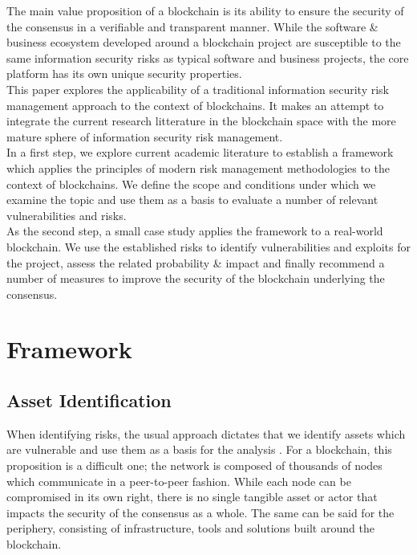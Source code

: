 \documentclass[12pt,a4paper]{article}
\begin{document}
The main value proposition of a \gls{blockchain} is its ability to ensure the security of the \gls{consensus} in a verifiable and transparent manner. While the software \& business ecosystem developed around a blockchain project are susceptible to the same information security risks as typical software and business projects, the core platform has its own unique security properties.\\

This paper explores the applicability of a traditional information security risk management approach to the context of \glspl{blockchain}. It makes an attempt to integrate the current research litterature in the blockchain space with the more mature sphere of information security risk management.\\

In a first step, we explore current academic literature to establish a framework which applies the principles of modern risk management methodologies to the context of \glspl{blockchain}. We define the scope and conditions under which we examine the topic and use them as a basis to evaluate a number of relevant vulnerabilities and risks.\\

As the second step, a small case study applies the framework to a real-world \gls{blockchain}. We use the established risks to identify vulnerabilities and exploits for the project, assess the related probability \& impact and finally recommend a number of measures to improve the security of the \gls{blockchain} underlying the \gls{consensus}.\\

\section{Framework}

\subsection{Asset Identification}

When identifying risks, the usual approach dictates that we identify assets which are vulnerable and use them as a basis for the analysis \cite{iso}. For a \gls{blockchain}, this proposition is a difficult one; the network is composed of thousands of nodes which communicate in a peer-to-peer fashion. While each node can be compromised in its own right, there is no single tangible asset or actor that impacts the security of the \gls{consensus} as a whole. The same can be said for the periphery, consisting of infrastructure, tools and solutions built around the \gls{blockchain}.\\
\end{document}
